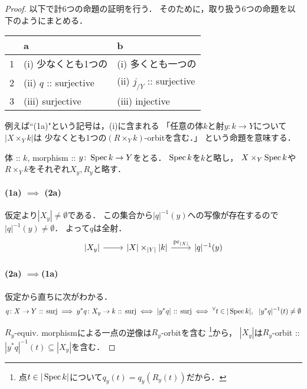 \documentclass[a4paper, dvipdfmx]{jsarticle}
\begin{document}
\begin{proof}
    以下で計$6$つの命題の証明を行う．
    そのために，取り扱う$6$つの命題を以下のようにまとめる．
    \begin{center}
    \begin{tabular}{|l|l|l|}
    \hline
          & a                       & b                             \\ \hline
        1 & (i) 少なくとも1つの     & (i) 多くとも一つの            \\ \hline
        2 & (ii) $q$ :: surjective  & (ii) $j_{/Y}$ :: surjective   \\ \hline
        3 & (iii) surjective        & (iii) injective               \\ \hline
    \end{tabular}
    \end{center}
    例えば``(1a)"という記号は，(i)に含まれる
    「任意の体$k$と射$y \colon k \to Y$について$|X \times_{Y} k|$は
        少なくとも1つの$(R \times_{Y} k)$-orbitを含む．」
    という命題を意味する．

    体 :: $k$, morphism :: $y \colon \operatorname{Spec} k \to Y$をとる．
    $\operatorname{Spec} k$を$k$と略し，
    $X \times_{Y} \operatorname{Spec} k$や$R \times_{Y} k$をそれぞれ$X_y, R_y$と略す．

    \paragraph{(1a) $\implies$ (2a)}
    仮定より$|X_y| \neq \emptyset$である．
    この集合から$|q|^{-1}(y)$への写像が存在するので$|q|^{-1}(y) \neq \emptyset$．
    よって$q$は全射．
    \[
    \begin{tikzcd}[]
        \vert X_y \vert \ar[r]&
        \vert X \vert \times_{\vert Y \vert} \vert k \vert \ar[r, "\pr_{\vert X \vert}"]&
        \vert q \vert^{-1}(y)
    \end{tikzcd}
    \]

    \paragraph{(2a) $\implies$(1a)}
    仮定から直ちに次がわかる．
    \[
                 q \colon X \to Y \text{ :: surj}
        \implies y^*q \colon X_y \to k \text{ :: surj}
        \iff     |y^*q| \text{ :: surj}
        \iff     {}^{\forall} t \in |\operatorname{Spec} k|,~~|y^*q|^{-1}(t) \neq \emptyset
    \]

    $R_y$-equiv. morphismによる一点の逆像は$R_y$-orbitを含む
        \footnote{ 点$t \in |\operatorname{Spec} k|$について$q_y(t)=q_y(R_y(t))$だから． }から，
    $|X_y|$は$R_y$-orbit :: $|y^*q|^{-1}(t) \subseteq |X_y|$を含む．


\end{proof}
\end{document}
